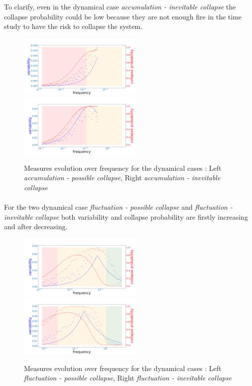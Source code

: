 \documentclass{article}
\begin{document}
To clarify, even in the dynamical case \textit{accumulation - inevitable collapse} the collapse probability could be low because they are not enough fire in the time study to have the risk to collapse the system.

\begin{figure}[h!]
\begin{center}
\includegraphics[width=6cm]{results/measures_acc_possible.png}
\includegraphics[width=6cm]{results/measures_acc_inevitable.png} 
\end{center}
\caption{\label{fig:temp}Measures evolution over frequency for the dynamical cases : Left \textit{accumulation - possible collapse}, Right \textit{accumulation - inevitable collapse}}
\label{acc_possible_and_inevitable}
\end{figure}



\paragraph{}
For the two dynamical case \textit{fluctuation - possible collapse} and \textit{fluctuation - inevitable collapse} both variability and collapse probability are firstly increasing and after decreasing. 



\begin{figure}[h!]
\begin{center}
\includegraphics[width=6cm]{results/measures_fluctuation_possible.png} \includegraphics[width=6cm]{results/measures_fluctuation_inevitable.png}
\end{center}
\caption{\label{fig:temp}Measures evolution over frequency for the dynamical cases : Left \textit{fluctuation - possible collapse}, Right \textit{fluctuation - inevitable collapse}}
\end{figure}
\end{document}
